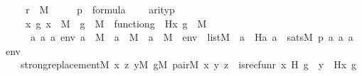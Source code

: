\begin{isabellebody}
\ \ \ \ {\isachardoublequoteopen}r\ {\isasymin}\ M{\isachardoublequoteclose}\ \isanewline
\ \ \ \ {\isachardoublequoteopen}p\ {\isasymin}\ formula{\isachardoublequoteclose}\isanewline
\ \ \ \ {\isachardoublequoteopen}arity{\isacharparenleft}{\kern0pt}p{\isacharparenright}{\kern0pt}\ {\isasymle}\ {}{\isachardoublequoteclose}\isanewline
\ \ \ \ {\isachardoublequoteopen}{\isacharparenleft}{\kern0pt}{\isasymAnd}x\ g{\isachardot}{\kern0pt}\ x\ {\isasymin}\ M\ {\isasymLongrightarrow}\ g\ {\isasymin}\ M\ {\isasymLongrightarrow}\ function{\isacharparenleft}{\kern0pt}g{\isacharparenright}{\kern0pt}\ {\isasymLongrightarrow}\ H{\isacharparenleft}{\kern0pt}x{\isacharcomma}{\kern0pt}\ g{\isacharparenright}{\kern0pt}\ {\isasymin}\ M{\isacharparenright}{\kern0pt}{\isachardoublequoteclose}\ \isanewline
\ \ \ \ {\isachardoublequoteopen}\ {\isacharparenleft}{\kern0pt}{\isasymAnd}a{}\ a{}\ a{}\ env{\isachardot}{\kern0pt}\ a{}\ {\isasymin}\ M\ {\isasymLongrightarrow}\ a{}\ {\isasymin}\ M\ {\isasymLongrightarrow}\ a{}\ {\isasymin}\ M\ {\isasymLongrightarrow}\ env\ {\isasymin}\ list{\isacharparenleft}{\kern0pt}M{\isacharparenright}{\kern0pt}\ {\isasymLongrightarrow}\ a{}\ {\isacharequal}{\kern0pt}\ H{\isacharparenleft}{\kern0pt}a{}{\isacharcomma}{\kern0pt}\ a{}{\isacharparenright}{\kern0pt}\ {\isasymlongleftrightarrow}\ sats{\isacharparenleft}{\kern0pt}M{\isacharcomma}{\kern0pt}\ p{\isacharcomma}{\kern0pt}\ {\isacharbrackleft}{\kern0pt}a{}{\isacharcomma}{\kern0pt}\ a{}{\isacharcomma}{\kern0pt}\ a{}{\isacharbrackright}{\kern0pt}\ {\isacharat}{\kern0pt}\ env{\isacharparenright}{\kern0pt}{\isacharparenright}{\kern0pt}{\isachardoublequoteclose}\ \ \isanewline
\ \ \ \isanewline
\ \ \ {\isachardoublequoteopen}strong{\isacharunderscore}{\kern0pt}replacement{\isacharparenleft}{\kern0pt}{\isacharhash}{\kern0pt}{\isacharhash}{\kern0pt}M{\isacharcomma}{\kern0pt}\ {\isasymlambda}x\ z{\isachardot}{\kern0pt}\ {\isasymexists}y{\isacharbrackleft}{\kern0pt}{\isacharhash}{\kern0pt}{\isacharhash}{\kern0pt}M{\isacharbrackright}{\kern0pt}{\isachardot}{\kern0pt}\ {\isasymexists}g{\isacharbrackleft}{\kern0pt}{\isacharhash}{\kern0pt}{\isacharhash}{\kern0pt}M{\isacharbrackright}{\kern0pt}{\isachardot}{\kern0pt}\ pair{\isacharparenleft}{\kern0pt}{\isacharhash}{\kern0pt}{\isacharhash}{\kern0pt}M{\isacharcomma}{\kern0pt}\ x{\isacharcomma}{\kern0pt}\ y{\isacharcomma}{\kern0pt}\ z{\isacharparenright}{\kern0pt}\ {\isasymand}\ is{\isacharunderscore}{\kern0pt}recfun{\isacharparenleft}{\kern0pt}r{\isacharcomma}{\kern0pt}\ x{\isacharcomma}{\kern0pt}\ H{\isacharcomma}{\kern0pt}\ g{\isacharparenright}{\kern0pt}\ {\isasymand}\ y\ {\isacharequal}{\kern0pt}\ H{\isacharparenleft}{\kern0pt}x{\isacharcomma}{\kern0pt}\ g{\isacharparenright}{\kern0pt}{\isacharparenright}{\kern0pt}{\isachardoublequoteclose}\isanewline

\end{isabellebody}
